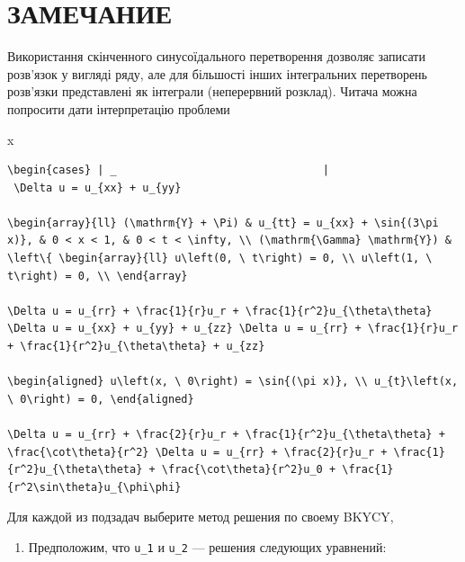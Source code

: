 \documentclass[
  ukrainian,
]{article}
\providecommand{\tightlist}{%
  \setlength{\itemsep}{0pt}\setlength{\parskip}{0pt}}
\begin{document}
\section{ЗАМЕЧАНИЕ}\label{ux437ux430ux43cux435ux447ux430ux43dux438ux435}

Використання скінченного синусоїдального перетворення дозволяє записати
розв'язок у вигляді ряду, але для більшості інших інтегральних
перетворень розв'язки представлені як інтеграли (неперервний розклад).
Читача можна попросити дати інтерпретацію проблеми

x

\begin{verbatim}
\begin{cases} | _                                |
 \Delta u = u_{xx} + u_{yy}

\begin{array}{ll} (\mathrm{Y} + \Pi) & u_{tt} = u_{xx} + \sin{(3\pi x)}, & 0 < x < 1, & 0 < t < \infty, \\ (\mathrm{\Gamma} \mathrm{Y}) & \left\{ \begin{array}{ll} u\left(0, \ t\right) = 0, \\ u\left(1, \ t\right) = 0, \\ \end{array}

\Delta u = u_{rr} + \frac{1}{r}u_r + \frac{1}{r^2}u_{\theta\theta} \Delta u = u_{xx} + u_{yy} + u_{zz} \Delta u = u_{rr} + \frac{1}{r}u_r + \frac{1}{r^2}u_{\theta\theta} + u_{zz}

\begin{aligned} u\left(x, \ 0\right) = \sin{(\pi x)}, \\ u_{t}\left(x, \ 0\right) = 0, \end{aligned}

\Delta u = u_{rr} + \frac{2}{r}u_r + \frac{1}{r^2}u_{\theta\theta} + \frac{\cot\theta}{r^2} \Delta u = u_{rr} + \frac{2}{r}u_r + \frac{1}{r^2}u_{\theta\theta} + \frac{\cot\theta}{r^2}u_0 + \frac{1}{r^2\sin\theta}u_{\phi\phi}
\end{verbatim}

Для каждой из подзадач выберите метод решения по своему BKYCY,

\begin{enumerate}
\def\labelenumi{\arabic{enumi}.}
\setcounter{enumi}{2}
\tightlist
\item
  Предположим, что \texttt{u\_1} и \texttt{u\_2} --- решения следующих
  уравнений:
\end{enumerate}
\end{document}
